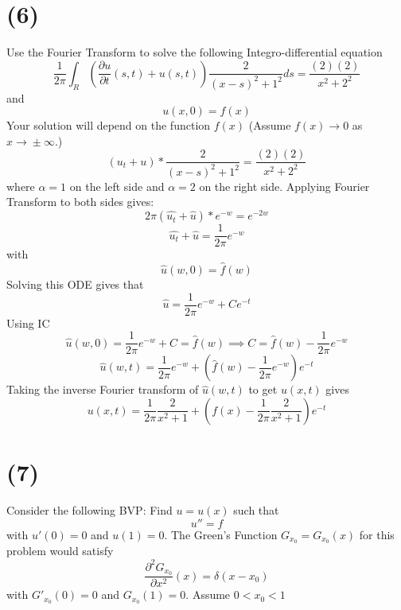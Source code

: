 \documentclass[preview,12pt]{article}
\begin{document}
\section*{(6)}
    Use the Fourier Transform to solve the following Integro-differential equation
    $$\frac{1}{2\pi}\int_R\left(\frac{\partial u}{\partial t}(s,t)+u(s,t)\right)\frac{2}{(x-s)^2+1^2}ds=\frac{(2)(2)}{x^2+2^2}$$
    and
    $$u(x,0)=f(x)$$
    Your solution will depend on the function $f(x)$ (Assume $f(x)\rightarrow{}0$ as $ x\rightarrow{}\pm\infty$.)
    $$(u_t+u)*\frac{2}{(x-s)^2+1^2}=\frac{(2)(2)}{x^2+2^2}$$
    where $\alpha=1$ on the left side and $\alpha=2$ on the right side. \newline
    Applying Fourier Transform to both sides gives:
    $$2\pi(\hat{u_t}+\hat{u})*e^{-w}=e^{-2w}$$
    $$\hat{u_t}+\hat{u}=\frac{1}{2\pi}e^{-w}$$
    with
    $$\hat{u}{(w,0)}=\hat{f}(w)$$
    Solving this ODE gives that
    $$\hat{u}=\frac{1}{2\pi}e^{-w}+Ce^{-t}$$
    Using IC
    $$\hat{u}(w,0)=\frac{1}{2\pi}e^{-w}+C=\hat{f}(w) \implies C=\hat{f}(w)-\frac{1}{2\pi}e^{-w}$$
    $$\hat{u}(w,t)=\frac{1}{2\pi}e^{-w}+(\hat{f}(w)-\frac{1}{2\pi}e^{-w})e^{-t}$$
    Taking the inverse Fourier transform of $\hat{u}(w,t)$ to get $u(x,t)$ gives
    $$u(x,t)=\frac{1}{2\pi}\frac{2}{x^2+1}+(f(x)-\frac{1}{2\pi}\frac{2}{x^2+1})e^{-t}$$
    
\section*{(7)}
    Consider the following BVP: Find $u=u(x)$ such that
    $$u''=f$$
    with $u'(0)=0$ and $u(1)=0$.  \newline
    The Green's Function $G_{x_0}=G_{x_0}(x)$ for this problem would satisfy
    $$\frac{\partial^2G_{x_0}}{\partial x^2}(x)=\delta(x-x_0)$$
    with $G'_{x_0}(0)=0$ and $G_{x_0}(1)=0$.  Assume $0<x_0<1$
\end{document}
